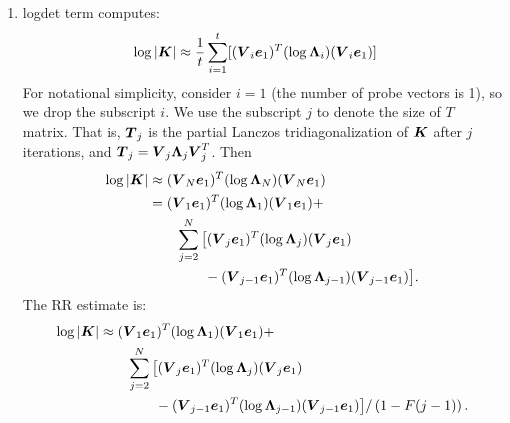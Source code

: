 \documentclass{article}
\begin{document}
\begin{enumerate}
  \item logdet term computes:
  \begin{align}
    \log | \boldsymbol{K} | &\approx \frac{1}{t} \sum_{i=1}^t [(\boldsymbol{V}_i \boldsymbol{e}_1)^T (\log {\boldsymbol{\Lambda}}_i ) (\boldsymbol{V}_i \boldsymbol{e}_1)]
  \end{align}
  For notational simplicity,
  consider $i=1$ (the number of probe vectors is 1), so we drop the subscript $i$.
  We use the subscript $j$ to denote the size of $T$ matrix.
  That is, $\boldsymbol{T}_j$ is the partial Lanczos tridiagonalization of $\boldsymbol{K}$ after $j$ iterations,
  and $\boldsymbol{T}_j = \boldsymbol{V}_j {\boldsymbol{\Lambda}}_j \boldsymbol{V}_j^T$. Then
  \begin{align}
    \log | \boldsymbol{K} | &\approx (\boldsymbol{V}_N \boldsymbol{e}_1)^T (\log {\boldsymbol{\Lambda}}_N ) (\boldsymbol{V}_N \boldsymbol{e}_1) \\
    &= (\boldsymbol{V}_1 \boldsymbol{e}_1)^T (\log {\boldsymbol{\Lambda}}_1 ) (\boldsymbol{V}_1 \boldsymbol{e}_1) + \\
   &\qquad   \sum_{j=2}^N \big[ (\boldsymbol{V}_j \boldsymbol{e}_1)^T (\log {\boldsymbol{\Lambda}}_j) (\boldsymbol{V}_j \boldsymbol{e}_1) \\
   & \qquad \qquad - (\boldsymbol{V}_{j-1} \boldsymbol{e}_1)^T (\log {\boldsymbol{\Lambda}}_{j-1} ) (\boldsymbol{V}_{j-1} \boldsymbol{e}_1) \big].
  \end{align}
  The RR estimate is:
  \begin{align}
    \log | \boldsymbol{K} |  &\approx (\boldsymbol{V}_1 \boldsymbol{e}_1)^T (\log {\boldsymbol{\Lambda}}_1 ) (\boldsymbol{V}_1 \boldsymbol{e}_1) + \\
   &\qquad   \sum_{j=2}^N \big[ (\boldsymbol{V}_j \boldsymbol{e}_1)^T (\log {\boldsymbol{\Lambda}}_j) (\boldsymbol{V}_j \boldsymbol{e}_1) \\
   & \qquad \qquad - (\boldsymbol{V}_{j-1} \boldsymbol{e}_1)^T (\log {\boldsymbol{\Lambda}}_{j-1} ) (\boldsymbol{V}_{j-1} \boldsymbol{e}_1) \big] / \left(1- F(j-1)\right).
  \end{align}
\end{enumerate}
\end{document}
